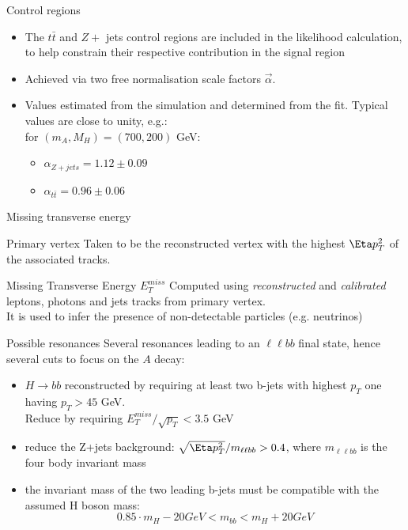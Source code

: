 \documentclass[10pt]{beamer} %
\begin{document}
\begin{frame}{Control regions}

\begin{itemize}
    \item The $t\bar{t}$ and $Z+$ jets control regions are included in the likelihood calculation, to help constrain their respective contribution in the signal region
    \item Achieved via two free normalisation scale factors $\vec{\alpha}$.
    \item Values estimated from the simulation and determined from the fit. Typical values are close to unity, e.g.:\\
    for $(m_A, M_H)=(700, 200)$ GeV:
    \begin{itemize}
        \item $\alpha_{Z+jets}=1.12 \pm 0.09$
        \item $\alpha_{t\bar{t}}=0.96\pm0.06$
    \end{itemize}
\end{itemize}

\end{frame}

\begin{frame}{Missing transverse energy}

    \begin{block}{Primary vertex}
        Taken to be the reconstructed vertex with the highest $\Eta p_T^2$ of the associated tracks.
    \end{block}

    \begin{block}{Missing Transverse Energy $E_T^{miss}$}
        Computed using \emph{reconstructed} and \emph{calibrated} leptons, photons and jets tracks from primary vertex.\\
        It is used to infer the presence of non-detectable particles (e.g. neutrinos)
    \end{block}

\end{frame}


\begin{frame}{Possible resonances}
    Several resonances leading to an $\ell\ell bb$ final state, hence several cuts to focus on the $A$ decay:
    \begin{itemize}
        \item $H \to bb$ reconstructed by requiring at least two b-jets with highest $p_T$ one having $p_T>45$ GeV. \\
        Reduce by requiring $E_T^{miss}/ \sqrt{p_T}<3.5$ GeV
        \item reduce the Z+jets background: $\sqrt{\Eta p_T^2}/m_{\ell\ell bb} > 0.4$, where $m_{\ell\ell bb}$ is the four body invariant mass
        \item the invariant mass of the two leading b-jets must be compatible with the assumed H boson mass:
            \begin{equation}
                0.85 \cdot m_H - 20 GeV < m_{bb} < m_H + 20 GeV
            \end{equation}
    \end{itemize}
\end{frame}
\end{document}
